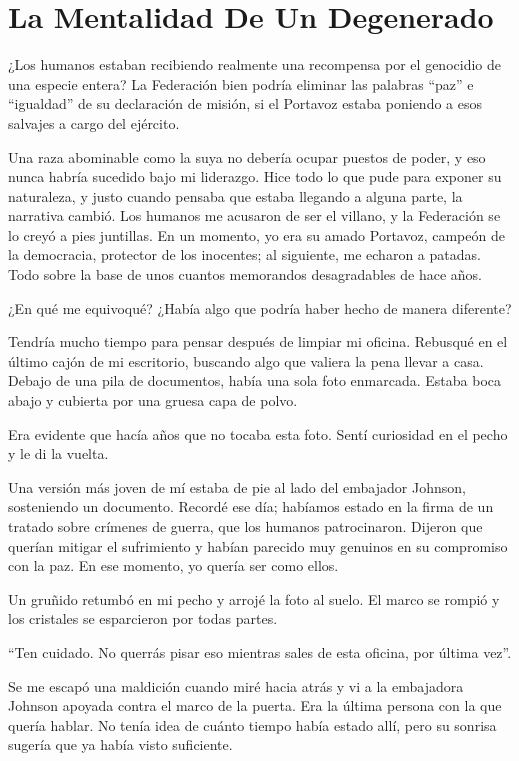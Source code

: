 \chapter{La Mentalidad De Un Degenerado}\label{sec:la-mentalidad-de-un-degenerado}

¿Los humanos estaban recibiendo realmente una recompensa por el genocidio de una especie entera? La Federación bien podría eliminar las palabras ``paz'' e ``igualdad'' de su declaración de misión, si el Portavoz estaba poniendo a esos salvajes a cargo del ejército.

Una raza abominable como la suya no debería ocupar puestos de poder, y eso nunca habría sucedido bajo mi liderazgo. Hice todo lo que pude para exponer su naturaleza, y justo cuando pensaba que estaba llegando a alguna parte, la narrativa cambió. Los humanos me acusaron de ser el villano, y la Federación se lo creyó a pies juntillas. En un momento, yo era su amado Portavoz, campeón de la democracia, protector de los inocentes; al siguiente, me echaron a patadas. Todo sobre la base de unos cuantos memorandos desagradables de hace años.

¿En qué me equivoqué? ¿Había algo que podría haber hecho de manera diferente?

Tendría mucho tiempo para pensar después de limpiar mi oficina. Rebusqué en el último cajón de mi escritorio, buscando algo que valiera la pena llevar a casa. Debajo de una pila de documentos, había una sola foto enmarcada. Estaba boca abajo y cubierta por una gruesa capa de polvo.

Era evidente que hacía años que no tocaba esta foto. Sentí curiosidad en el pecho y le di la vuelta.

Una versión más joven de mí estaba de pie al lado del embajador Johnson, sosteniendo un documento. Recordé ese día; habíamos estado en la firma de un tratado sobre crímenes de guerra, que los humanos patrocinaron. Dijeron que querían mitigar el sufrimiento y habían parecido muy genuinos en su compromiso con la paz. En ese momento, yo quería ser como ellos.

Un gruñido retumbó en mi pecho y arrojé la foto al suelo. El marco se rompió y los cristales se esparcieron por todas partes.

``Ten cuidado. No querrás pisar eso mientras sales de esta oficina, por última vez''.

Se me escapó una maldición cuando miré hacia atrás y vi a la embajadora Johnson apoyada contra el marco de la puerta. Era la última persona con la que quería hablar. No tenía idea de cuánto tiempo había estado allí, pero su sonrisa sugería que ya había visto suficiente.

